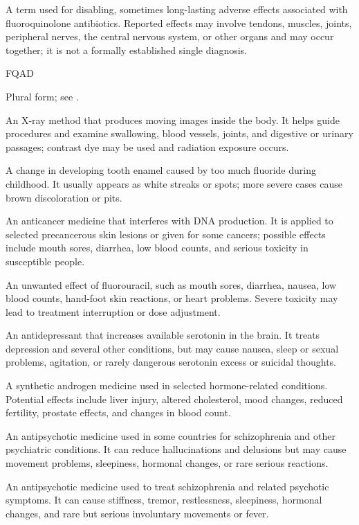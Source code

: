  A term used for disabling, sometimes long-lasting adverse effects associated with fluoroquinolone antibiotics. Reported effects may involve tendons, muscles, joints, peripheral nerves, the central nervous system, or other organs and may occur together; it is not a formally established single diagnosis.

\synonyms
FQAD

 Plural form; see .

 An X-ray method that produces moving images inside the body. It helps guide procedures and examine swallowing, blood vessels, joints, and digestive or urinary passages; contrast dye may be used and radiation exposure occurs.

 A change in developing tooth enamel caused by too much fluoride during childhood. It usually appears as white streaks or spots; more severe cases cause brown discoloration or pits.

 An anticancer medicine that interferes with DNA production. It is applied to selected precancerous skin lesions or given for some cancers; possible effects include mouth sores, diarrhea, low blood counts, and serious toxicity in susceptible people.

 An unwanted effect of fluorouracil, such as mouth sores, diarrhea, nausea, low blood counts, hand-foot skin reactions, or heart problems. Severe toxicity may lead to treatment interruption or dose adjustment.

 An antidepressant that increases available serotonin in the brain. It treats depression and several other conditions, but may cause nausea, sleep or sexual problems, agitation, or rarely dangerous serotonin excess or suicidal thoughts.

 A synthetic androgen medicine used in selected hormone-related conditions. Potential effects include liver injury, altered cholesterol, mood changes, reduced fertility, prostate effects, and changes in blood count.

 An antipsychotic medicine used in some countries for schizophrenia and other psychiatric conditions. It can reduce hallucinations and delusions but may cause movement problems, sleepiness, hormonal changes, or rare serious reactions.

 An antipsychotic medicine used to treat schizophrenia and related psychotic symptoms. It can cause stiffness, tremor, restlessness, sleepiness, hormonal changes, and rare but serious involuntary movements or fever.

